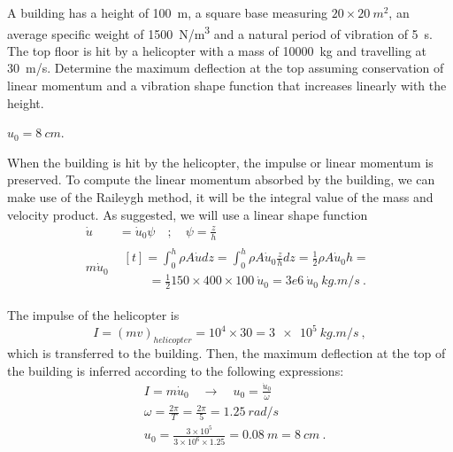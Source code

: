 
\begin{Exercise}[label={helicopter_impulse}]
A building has a height of \SI{100}{m}, a square base measuring $20\times\SI{20}{m^2}$, an average specific weight of \SI{1500}{N/m^3} and a natural period of vibration of \SI{5}{s}. The top floor is hit by a helicopter with a mass of \SI{10000}{kg} and travelling at \SI{30}{m/s}. Determine the maximum deflection at the top assuming conservation of linear momentum and a vibration shape function that increases linearly with the height.

\begin{center}
\end{center}

\shortAnswer $u_0 = \SI{8}{cm}$.
\end{Exercise}



\begin{Answer}[ref={helicopter_impulse}]
When the building is hit by the helicopter, the impulse or linear momentum is preserved. To compute the linear momentum absorbed by the building, we can make use of the Raileygh method, it will be the integral value of the mass and velocity product. As suggested, we will use a linear shape function
\begin{align*}
\dot{u}& = \dot{u}_0\psi \quad ; \quad \psi = \frac{z}{h} \\
m\dot{u}_0& \begin{multlined}[t] = \int_0^h \rho A\dot{u}dz = \int_0^h \rho A\dot{u}_0\frac{z}{h}dz = \frac{1}{2}\rho A\dot{u}_0h = \\
    \qquad= \frac{1}{2}150\times400\times100\ \dot{u}_0
        = 3e6\ \dot{u}_0\ \si{kg.m/s}\ .\end{multlined}
\end{align*}

The impulse of the helicopter is
$$
I = (mv)_{helicopter} = 10^4 \times 30 = \SI{3e5}{kg.m/s}\ ,
$$
which is transferred to the building. Then, the maximum deflection at the top of the building is inferred according to the following expressions:
\begin{align*}
&I = m\dot{u}_0 \quad \rightarrow \quad u_0 = \frac{\dot{u}_0}{\omega} \\
&\omega = \frac{2\pi}{T} = \frac{2\pi}{5} = \SI{1.25}{rad/s} \\
&u_0 = \frac{3\times 10^5}{3\times 10^6\times 1.25} = \SI{0.08}{m} = \SI{8}{cm}\ .
\end{align*}

\end{Answer}
